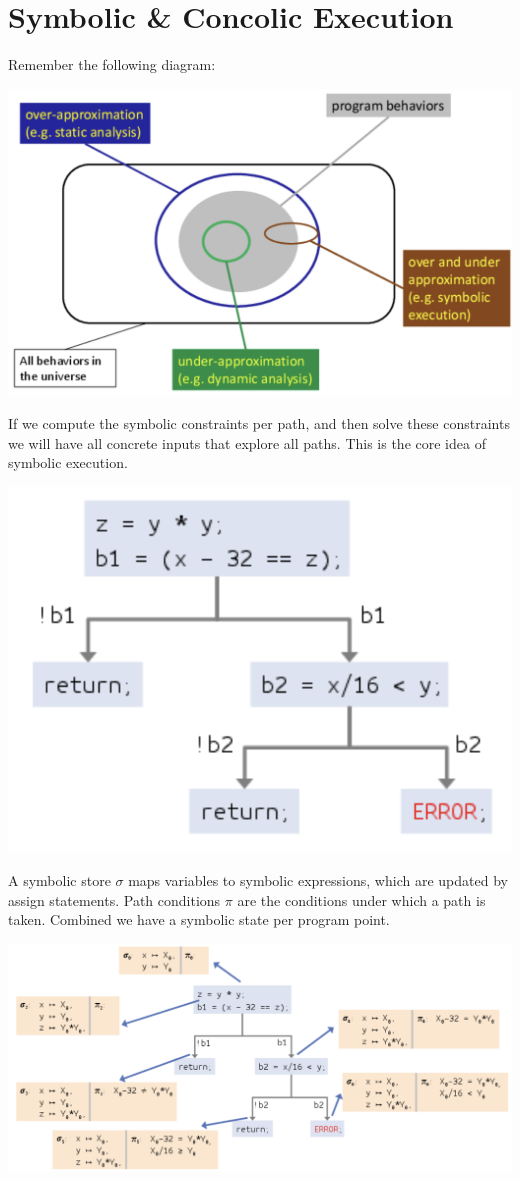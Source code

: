 \section{Symbolic \& Concolic Execution}

Remember the following diagram:

\begin{center}
	\includegraphics[width=0.8\columnwidth]{assets/program_behavior}
\end{center}

If we compute the symbolic constraints per path, and then solve these constraints we will have all concrete inputs that explore all paths. This is the core idea of symbolic execution.

\begin{center}
	\includegraphics[width=0.5\columnwidth]{assets/path}
\end{center}

A symbolic store $\sigma$ maps variables to symbolic expressions, which are updated by assign statements. Path conditions $\pi$ are the conditions under which a path is taken. Combined we have a symbolic state per program point.
\begin{center}
	\includegraphics[width=\columnwidth]{assets/symbolic_execution}
\end{center}

